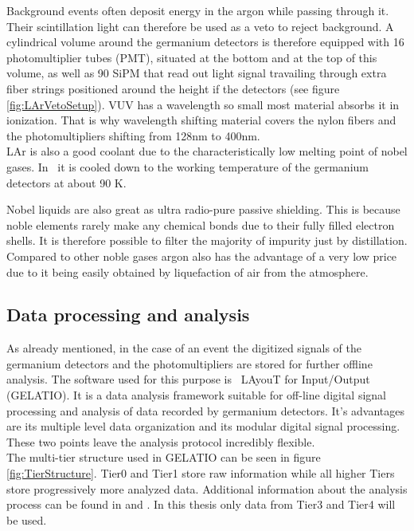 \documentclass[encoding=utf8,british]{tumphthesis}
\begin{document}
Background events often deposit energy in the argon while passing through it.
Their scintillation light can therefore be used as a veto to reject background.
A cylindrical volume around the germanium detectors is therefore equipped with 16 photomultiplier tubes (PMT), situated at the bottom and at the top of this volume, as well as 90 SiPM that read out light signal travailing through extra fiber strings positioned around the height if the detectors \cite{csathy_optical_2016} (see figure \ref{fig:LArVetoSetup}).
VUV has a wavelength so small most material absorbs it in ionization.
That is why wavelength shifting material covers the nylon fibers and the photomultipliers shifting from 128nm to 400nm.
\\

LAr is also a good coolant due to the characteristically low melting point of nobel gases.
In \gerda\ it is cooled down to the working temperature of the germanium detectors at about 90 K.

Nobel liquids are also great as ultra radio-pure passive shielding.
This is because noble elements rarely make any chemical bonds due to their fully filled electron shells.
It is therefore possible to filter the majority of impurity just by distillation.
Compared to other noble gases argon also has the advantage of a very low price due to it being easily obtained by liquefaction of air from the atmosphere.
\\

\subsection{Data processing and analysis}
\label{sec:DataProc}

As already mentioned, in the case of an event the digitized signals of the germanium detectors and the photomultipliers are stored for further offline analysis.
The software used for this purpose is \gerda\ LAyouT for Input/Output (GELATIO).
It is a data analysis framework suitable for off-line digital signal processing and analysis of data recorded by germanium detectors.
It's advantages are its multiple level data organization and its modular digital signal processing.
These two points leave the analysis protocol incredibly flexible.
\\

The multi-tier structure used in GELATIO can be seen in figure \ref{fig:TierStructure}.
Tier0 and Tier1 store raw information while all higher Tiers store progressively more analyzed data.
Additional information about the analysis process can be found in \cite{agostini_gelatio:_2011} and \cite{agostini_off-line_2011}.
In this thesis only data from Tier3 and Tier4 will be used.
\\
\end{document}
